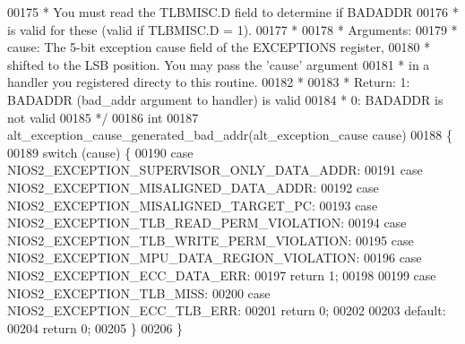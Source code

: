 \begin{DoxyCode}
00175 \textcolor{comment}{ * You must read the TLBMISC.D field to determine if BADADDR}
00176 \textcolor{comment}{ * is valid for these (valid if TLBMISC.D = 1).}
00177 \textcolor{comment}{ *}
00178 \textcolor{comment}{ * Arguments:}
00179 \textcolor{comment}{ * cause:  The 5-bit exception cause field of the EXCEPTIONS register,}
00180 \textcolor{comment}{ *         shifted to the LSB position. You may pass the 'cause' argument}
00181 \textcolor{comment}{ *         in a handler you registered directy to this routine.}
00182 \textcolor{comment}{ *}
00183 \textcolor{comment}{ * Return: 1: BADADDR (bad\_addr argument to handler) is valid}
00184 \textcolor{comment}{ *         0: BADADDR is not valid}
00185 \textcolor{comment}{ */}
00186 \textcolor{keywordtype}{int} 
00187 alt_exception_cause_generated_bad_addr(alt_exception_cause cause)
00188 \{
00189   \textcolor{keywordflow}{switch} (cause) \{
00190   \textcolor{keywordflow}{case} NIOS2_EXCEPTION_SUPERVISOR_ONLY_DATA_ADDR:
00191   \textcolor{keywordflow}{case} NIOS2_EXCEPTION_MISALIGNED_DATA_ADDR:
00192   \textcolor{keywordflow}{case} NIOS2_EXCEPTION_MISALIGNED_TARGET_PC:
00193   \textcolor{keywordflow}{case} NIOS2_EXCEPTION_TLB_READ_PERM_VIOLATION:
00194   \textcolor{keywordflow}{case} NIOS2_EXCEPTION_TLB_WRITE_PERM_VIOLATION:
00195   \textcolor{keywordflow}{case} NIOS2_EXCEPTION_MPU_DATA_REGION_VIOLATION:
00196   \textcolor{keywordflow}{case} NIOS2_EXCEPTION_ECC_DATA_ERR:
00197     \textcolor{keywordflow}{return} 1;
00198 
00199   \textcolor{keywordflow}{case} NIOS2_EXCEPTION_TLB_MISS:
00200   \textcolor{keywordflow}{case} NIOS2_EXCEPTION_ECC_TLB_ERR:
00201     \textcolor{keywordflow}{return} 0;
00202 
00203   \textcolor{keywordflow}{default}:
00204     \textcolor{keywordflow}{return} 0;
00205   \}
00206 \}
\end{DoxyCode}
